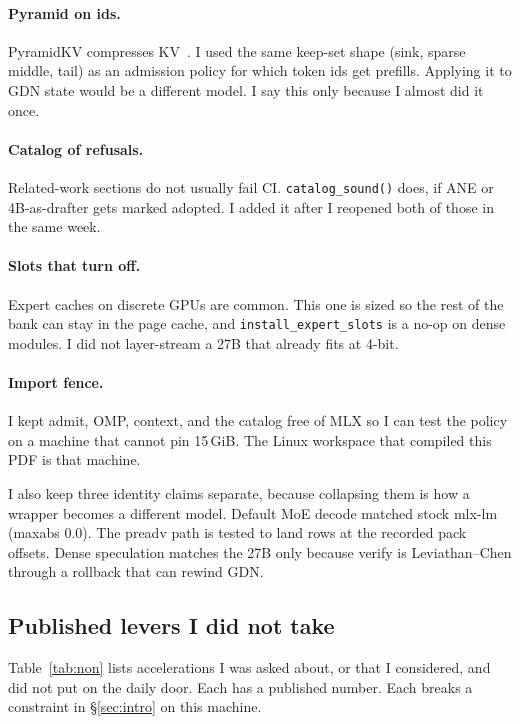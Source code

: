 \paragraph{Pyramid on ids.}
PyramidKV compresses KV~\citep{pyramidkv}. I used the same keep-set shape (sink, sparse middle, tail) as an admission policy for which token ids get prefills. Applying it to GDN state would be a different model. I say this only because I almost did it once.

\paragraph{Catalog of refusals.}
Related-work sections do not usually fail CI. \texttt{catalog\_sound()} does, if ANE or 4B-as-drafter gets marked adopted. I added it after I reopened both of those in the same week.

\paragraph{Slots that turn off.}
Expert caches on discrete GPUs are common. This one is sized so the rest of the bank can stay in the page cache, and \texttt{install\_expert\_slots} is a no-op on dense modules. I did not layer-stream a 27B that already fits at 4-bit.

\paragraph{Import fence.}
I kept admit, OMP, context, and the catalog free of MLX so I can test the policy on a machine that cannot pin 15\,GiB. The Linux workspace that compiled this PDF is that machine.

I also keep three identity claims separate, because collapsing them is how a wrapper becomes a different model. Default MoE decode matched stock mlx-lm (maxabs 0.0). The preadv path is tested to land rows at the recorded pack offsets. Dense speculation matches the 27B only because verify is Leviathan--Chen through a rollback that can rewind GDN.

\subsection{Published levers I did not take}

Table~\ref{tab:non} lists accelerations I was asked about, or that I considered, and did not put on the daily door. Each has a published number. Each breaks a constraint in \S\ref{sec:intro} on this machine.

